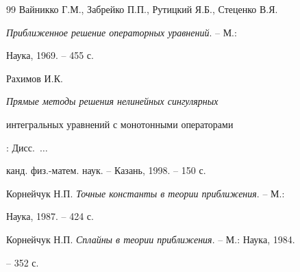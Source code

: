 \begin{thebibliography}{99}
Вайникко Г.М., Забрейко П.П., Рутицкий Я.Б., Стеценко В.Я.


{\em Приближенное решение операторных уравнений}. -- М.: 


Наука, 1969. -- 455 с.




Рахимов И.К. {\em Прямые методы решения нелинейных сингулярных 


интегральных уравнений с монотонными операторами}: Дисс.~$\dotsc$ 


канд. физ.-матем. наук. -- Казань, 1998. -- 150 с.





\end{thebibliography}





\vskip 2cm












\label{end}













Корнейчук Н.П. {\em Точные константы в теории приближения}. -- М.: 


Наука, 1987. -- 424 с.




Корнейчук Н.П. {\em Сплайны в теории приближения}. -- М.: Наука, 1984. 


-- 352 с.


